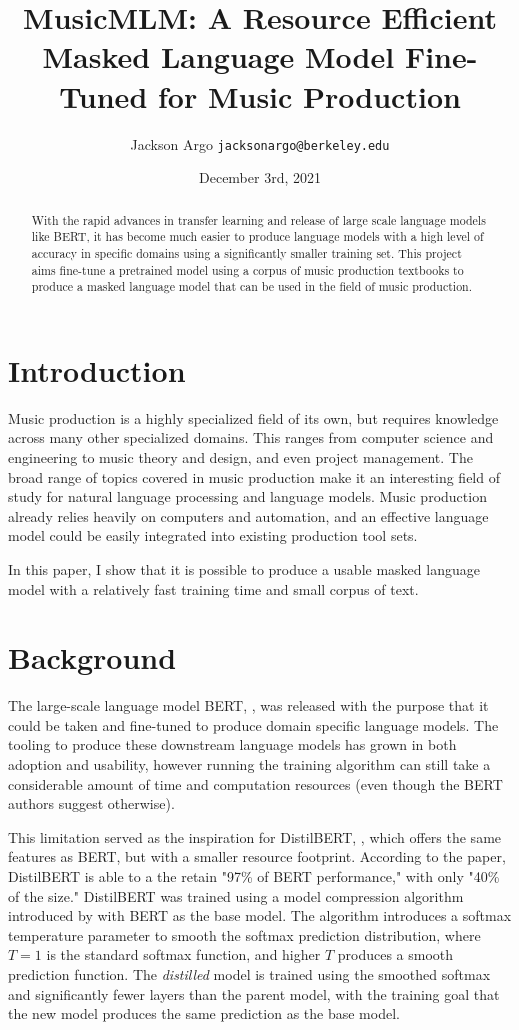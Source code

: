 \documentclass[11pt,a4paper]{article}
\title{MusicMLM: A Resource Efficient Masked Language Model Fine-Tuned for Music Production}
\author{Jackson Argo \texttt{jacksonargo@berkeley.edu}}
\date{December 3rd, 2021}
\begin{document}
\maketitle

\begin{abstract}
With the rapid advances in transfer learning and release of large scale language models like BERT, it has become much easier to produce language models with a high level of accuracy in specific domains using a significantly smaller training set. This project aims fine-tune a pretrained model using a corpus of music production textbooks to produce a masked language model that can be used in the field of music production.
\end{abstract}


\section{Introduction}

Music production is a highly specialized field of its own, but requires knowledge across many other specialized domains. This ranges from computer science and engineering to music theory and design, and even project management. The broad range of topics covered in music production make it an interesting field of study for natural language processing and language models. Music production already relies heavily on computers and automation, and an effective language model could be easily integrated into existing production tool sets.

In this paper, I show that it is possible to produce a usable masked language model with a relatively fast training time and small corpus of text. 

\section{Background}

The large-scale language model BERT, \cite{BERT}, was released with the purpose that it could be taken and fine-tuned to produce domain specific language models. The tooling to produce these downstream language models has grown in both adoption and usability, however running the training algorithm can still take a considerable amount of time and computation resources (even though the BERT authors suggest otherwise).

This limitation served as the inspiration for DistilBERT, \citep{DistilBERT}, which offers the same features as BERT, but with a smaller resource footprint. According to the paper, DistilBERT is able to a the retain "97\% of BERT performance," with only "40\% of the size." DistilBERT was trained using a model compression algorithm introduced by \citet{Hinton:2015} with BERT as the base model. The algorithm introduces a softmax temperature parameter to smooth the softmax prediction distribution, where $T = 1$ is the standard softmax function, and higher $T$ produces a smooth prediction function. The \textit{distilled} model is trained using the smoothed softmax and significantly fewer layers than the parent model, with the training goal that the new model produces the same prediction as the base model.
\end{document}
